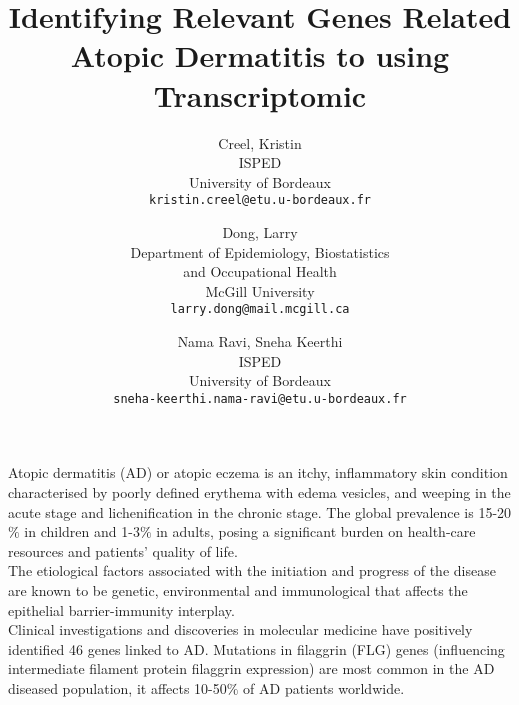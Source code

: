 \documentclass[journal, a4paper]{IEEEtran}
\begin{document}
\title{\Large{Identifying Relevant Genes Related Atopic Dermatitis  to  using Transcriptomic}}
\author{%
\begin{tabular}{c} Creel, Kristin \\ ISPED \\ University of Bordeaux \\ \texttt{kristin.creel@etu.u-bordeaux.fr} \end{tabular} \and
\begin{tabular}{c} Dong, Larry \\ Department of Epidemiology, Biostatistics \\ and Occupational Health \\ McGill University \\ \texttt{larry.dong@mail.mcgill.ca} \end{tabular} \and
\begin{tabular}{c} Nama Ravi, Sneha Keerthi \\ ISPED \\ University of Bordeaux \\ \texttt{sneha-keerthi.nama-ravi@etu.u-bordeaux.fr} \end{tabular}}
\maketitle





Atopic dermatitis (AD) or atopic eczema is an itchy, inflammatory skin condition characterised by poorly defined erythema with edema vesicles, and weeping in the acute stage and lichenification in the chronic stage. The global prevalence is 15-20 $\%$ in children and 1-3$\%$ in adults, posing a significant burden on health-care resources and patients’ quality of life\cite{nutten2015atopic}.\\

The etiological factors associated with the initiation and progress of the disease are known to be genetic, environmental and immunological that affects the epithelial barrier-immunity interplay\cite{peng2015pathogenesis}.\\

Clinical investigations and discoveries in molecular medicine have positively identified 46 genes linked to AD. Mutations in filaggrin (FLG) genes (influencing intermediate filament protein filaggrin expression) are most common in the AD diseased population, it affects 10-50$\%$ of AD patients worldwide.\\
\end{document}
